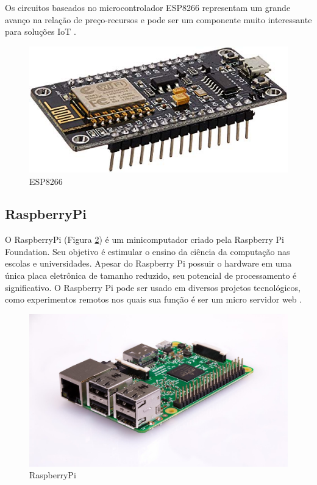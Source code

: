 Os circuitos baseados no microcontrolador ESP8266 representam um grande avanço na relação de preço-recursos e pode ser um componente muito interessante para soluções IoT \cite {de2017internet}.

\begin{figure}[htbp]
		\centering
		\includegraphics[scale=0.5]{figuras/esp8266_.jpg}
		\caption{ESP8266}
		\label{fig:esp}
\end{figure}


\subsection{RaspberryPi}

O RaspberryPi (Figura \ref{fig:rpi}) é um minicomputador criado pela Raspberry Pi Foundation. Seu objetivo é estimular o ensino da ciência da computação nas escolas e universidades. Apesar do Raspberry Pi possuir o hardware em uma única placa eletrônica de tamanho reduzido, seu potencial de processamento é significativo. O Raspberry Pi pode ser usado em diversos projetos tecnológicos, como experimentos remotos nos quais sua função é ser um micro servidor web \cite{crotti2013raspberrypi}.

\begin{figure}[htbp]
		\centering
		\includegraphics[scale=0.2]{figuras/raspberrypi.jpg}
		\caption{RaspberryPi}
		\label{fig:rpi}
\end{figure}

